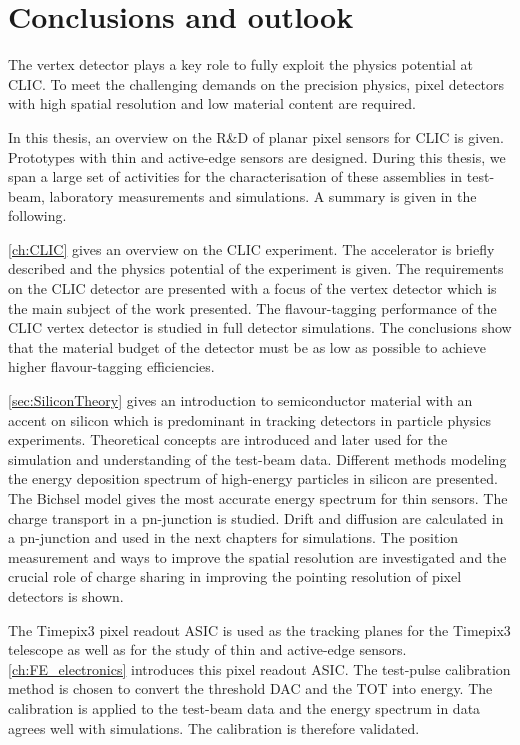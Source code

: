 \chapter{Conclusions and outlook}
\label{ch:conclusions}


The vertex detector plays a key role to fully exploit the physics
potential at CLIC. To meet the challenging demands on the precision
physics, pixel detectors with high spatial resolution and low material
content are required.

In this thesis, an overview on the R\&D of planar pixel sensors for
CLIC is given. Prototypes with thin and active-edge sensors are
designed. During this thesis, we span a large set of activities for
the characterisation of these assemblies in test-beam, laboratory
measurements and simulations. A summary is given in the following.

\cref{ch:CLIC} gives an overview on the CLIC experiment. The
accelerator is briefly described and the physics potential of the
experiment is given. The requirements on the CLIC detector are
presented with a focus of the vertex detector which is the main
subject of the work presented. The flavour-tagging performance of the
CLIC vertex detector is studied in full detector simulations. The
conclusions show that the material budget of the detector must be as
low as possible to achieve higher flavour-tagging efficiencies.

\cref{sec:SiliconTheory} gives an introduction to semiconductor
material with an accent on silicon which is predominant in tracking
detectors in particle physics experiments. Theoretical concepts are
introduced and later used for the simulation and understanding of the
test-beam data. Different methods modeling the energy deposition
spectrum of high-energy particles in silicon are presented. The
Bichsel model gives the most accurate energy spectrum for thin
sensors. The charge transport in a pn-junction is studied. Drift and
diffusion are calculated in a pn-junction and used in the next
chapters for simulations. The position measurement and ways to improve
the spatial resolution are investigated and the crucial role of charge
sharing in improving the pointing resolution of pixel detectors is
shown.

The Timepix3 pixel readout ASIC is used as the tracking planes for the
Timepix3 telescope as well as for the study of thin and active-edge
sensors. \cref{ch:FE_electronics} introduces this pixel readout
ASIC. The test-pulse calibration method is chosen to convert the
threshold DAC and the TOT into energy. The calibration is applied to
the test-beam data and the energy spectrum in data agrees well with
simulations. The calibration is therefore validated.


